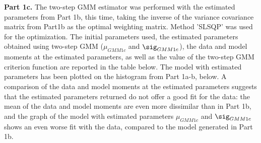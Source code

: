 \documentclass[letterpaper,12pt]{article}
\theoremstyle{definition}
\begin{document}
\noindent\newline\textbf{Part 1c.} The two-step GMM estimator was performed with the estimated parameters from Part 1b, this time, taking the inverse of the variance covariance matrix from Part1b as the optimal weighting matrix.  Method 'SLSQP' was used for the optimization. The initial parameters used, the estimated parameters obtained using two-step GMM ($\mu_{GMM1c}$ and $\sig_{GMM1c}$), the data and model moments at the estimated parameters, as well as the value of the two-step GMM criterion function are reported in the table below. The model with estimated parameters has been plotted on the histogram from Part 1a-b, below. A comparison of the data and model moments at the estimated parameters suggests that the estimated parameters returned do not offer a good fit for the data: the mean of the data and model moments are even more dissimilar than in Part 1b, and the graph of the model with estimated parameters $\mu_{GMM1c}$ and $\sig_{GMM1c}$ shows an even worse fit with the data, compared to the model generated in Part 1b.

\begin{center}
\end{center}
\end{document}
